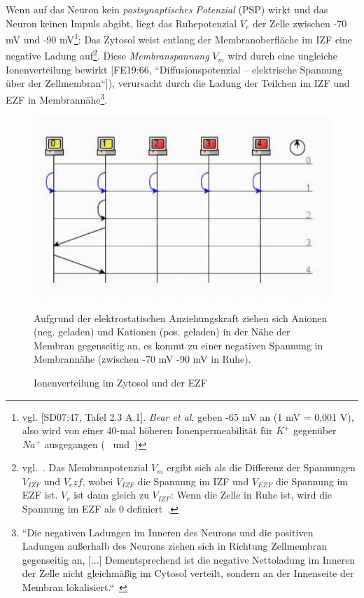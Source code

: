 {Wenn auf das Neuron kein \textit{postsynaptisches Potenzial} (PSP) wirkt und das Neuron keinen Impuls abgibt, liegt das Ruhepotenzial $V_r$ der Zelle zwischen -70 mV und -90 mV\footnote{
   vgl. {[SD07:47, Tafel 2.3 A.1]}. \textit{Bear et al.} geben -65 mV an (1 mV = 0,001 V), also wird von einer 40-mal höheren Ionenpermeabilität für $K^+$ gegenüber $Na^+$ ausgegangen (~\cite[74, Exkurs 3.2]{BCP18} und~\cite[70]{BCP18})
}: Das Zytosol weist entlang der Membranoberfläche im IZF eine negative Ladung auf\footnote{
 vgl.~\cite[61]{BCP18}. Das Membranpotenzial $V_m$ ergibt sich als die Differenz der Spannungen $V_{IZF}$ und $V_ezf$, wobei $V_{IZF}$ die Spannung im IZF und $V_{EZF}$ die Spannung im EZF ist. $V_r$ ist dann gleich zu $V_{IZF}$: Wenn die Zelle in Ruhe ist, wird die Spannung im EZF als $0$ definiert~\cite[127]{KSJ+13}.
}.
Diese \textit{Membranspannung} $V_m$ wird durch eine ungleiche Ionenverteilung bewirkt [FE19:66, ``Diffusionspotenzial – elektrische Spannung über der Zellmembran``]), verursacht durch die Ladung der Teilchen im IZF und EZF in Membrannähe\footnote{
 ``Die negativen Ladungen im Inneren des Neurons und die positiven Ladungen außerhalb des Neurons ziehen sich in Richtung Zellmembran gegenseitig an, {[...]} Dementsprechend ist die negative Nettoladung im Inneren der Zelle nicht gleichmäßig im Cytosol verteilt, sondern an der Innenseite der Membran lokalisiert.``~\cite[72, Punkt 2]{BCP18}
}.


\begin{figure}[h]
 \centering
 \includegraphics{images/p1ReadSeq.pdf}
 \caption{Ionenverteilung im Zytosol und der EZF}
 \small
 Aufgrund der elektrostatischen Anziehungskraft ziehen sich Anionen (neg. geladen) und Kationen (pos. geladen) in der Nähe der Membran gegenseitig an, es kommt zu einer negativen Spannung in Membrannähe (zwischen -70 mV -90 mV in Ruhe).
\end{figure}

}
